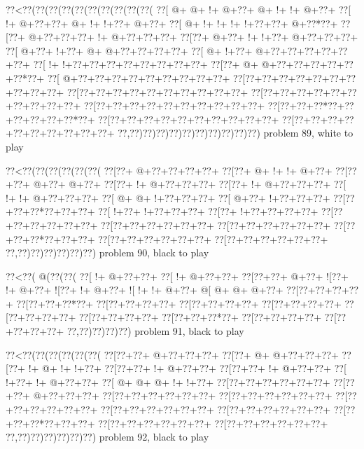 \vbox{\vbox{\goo
\0??<\0??(\0??(\0??(\0??(\0??(\0??(\0??(\0??(\0??(\0??(
\0??[\- @+\- @+\- !+\- @+\0??+\- @+\- !+\- !+\- @+\0??+
\0??[\- !+\- @+\0??+\0??+\- @+\- !+\- !+\0??+\- @+\0??+
\0??[\- @+\- !+\- !+\- !+\- !+\0??+\0??+\- @+\0??*\0??+
\0??[\0??+\- @+\0??+\0??+\0??+\- !+\- @+\0??+\0??+\0??+
\0??[\0??+\- @+\0??+\- !+\- !+\0??+\- @+\0??+\0??+\0??+
\0??[\- @+\0??+\- !+\0??+\- @+\- @+\0??+\0??+\0??+\0??+
\0??[\- @+\- !+\0??+\- @+\0??+\0??+\0??+\0??+\0??+\0??+
\0??[\- !+\- !+\0??+\0??+\0??+\0??+\0??+\0??+\0??+\0??+
\0??[\0??+\- @+\- @+\0??+\0??+\0??+\0??+\0??+\0??*\0??+
\0??[\- @+\0??+\0??+\0??+\0??+\0??+\0??+\0??+\0??+\0??+
\0??[\0??+\0??+\0??+\0??+\0??+\0??+\0??+\0??+\0??+\0??+
\0??[\0??+\0??+\0??+\0??+\0??+\0??+\0??+\0??+\0??+\0??+
\0??[\0??+\0??+\0??+\0??+\0??+\0??+\0??+\0??+\0??+\0??+
\0??[\0??+\0??+\0??+\0??+\0??+\0??+\0??+\0??+\0??+\0??+
\0??[\0??+\0??+\0??*\0??+\0??+\0??+\0??+\0??+\0??*\0??+
\0??[\0??+\0??+\0??+\0??+\0??+\0??+\0??+\0??+\0??+\0??+
\0??[\0??+\0??+\0??+\0??+\0??+\0??+\0??+\0??+\0??+\0??+
\0??,\0??)\0??)\0??)\0??)\0??)\0??)\0??)\0??)\0??)\0??)
}
\hfil problem 89, white to play\hfil\break
}

\vbox{\vbox{\goo
\0??<\0??(\0??(\0??(\0??(\0??(\0??(
\0??[\0??+\- @+\0??+\0??+\0??+\0??+
\0??[\0??+\- @+\- !+\- !+\- @+\0??+
\0??[\0??+\0??+\- @+\0??+\- @+\0??+
\0??[\0??+\- !+\- @+\0??+\0??+\0??+
\0??[\0??+\- !+\- @+\0??+\0??+\0??+
\0??[\- !+\- !+\- @+\0??+\0??+\0??+
\0??[\- @+\- @+\- !+\0??+\0??+\0??+
\0??[\- @+\0??+\- !+\0??+\0??+\0??+
\0??[\0??+\0??+\0??*\0??+\0??+\0??+
\0??[\- !+\0??+\- !+\0??+\0??+\0??+
\0??[\0??+\- !+\0??+\0??+\0??+\0??+
\0??[\0??+\0??+\0??+\0??+\0??+\0??+
\0??[\0??+\0??+\0??+\0??+\0??+\0??+
\0??[\0??+\0??+\0??+\0??+\0??+\0??+
\0??[\0??+\0??+\0??*\0??+\0??+\0??+
\0??[\0??+\0??+\0??+\0??+\0??+\0??+
\0??[\0??+\0??+\0??+\0??+\0??+\0??+
\0??,\0??)\0??)\0??)\0??)\0??)\0??)
}
\hfil problem 90, black to play\hfil\break
}

\vbox{\vbox{\goo
\0??<\0??(\- @(\0??(\0??(
\0??[\- !+\- @+\0??+\0??+
\0??[\- !+\- @+\0??+\0??+
\0??[\0??+\0??+\- @+\0??+
\- ![\0??+\- !+\- @+\0??+
\- ![\0??+\- !+\- @+\0??+
\- ![\- !+\- !+\- @+\0??+
\- @[\- @+\- @+\- @+\0??+
\0??[\0??+\0??+\0??+\0??+
\0??[\0??+\0??+\0??*\0??+
\0??[\0??+\0??+\0??+\0??+
\0??[\0??+\0??+\0??+\0??+
\0??[\0??+\0??+\0??+\0??+
\0??[\0??+\0??+\0??+\0??+
\0??[\0??+\0??+\0??+\0??+
\0??[\0??+\0??+\0??*\0??+
\0??[\0??+\0??+\0??+\0??+
\0??[\0??+\0??+\0??+\0??+
\0??,\0??)\0??)\0??)\0??)
}
\hfil problem 91, black to play\hfil\break
}

\vbox{\vbox{\goo
\0??<\0??(\0??(\0??(\0??(\0??(\0??(
\0??[\0??+\0??+\- @+\0??+\0??+\0??+
\0??[\0??+\- @+\- @+\0??+\0??+\0??+
\0??[\0??+\- !+\- @+\- !+\- !+\0??+
\0??[\0??+\0??+\- !+\- @+\0??+\0??+
\0??[\0??+\0??+\- !+\- @+\0??+\0??+
\0??[\- !+\0??+\- !+\- @+\0??+\0??+
\0??[\- @+\- @+\- @+\- !+\- !+\0??+
\0??[\0??+\0??+\0??+\0??+\0??+\0??+
\0??[\0??+\0??+\- @+\0??+\0??+\0??+
\0??[\0??+\0??+\0??+\0??+\0??+\0??+
\0??[\0??+\0??+\0??+\0??+\0??+\0??+
\0??[\0??+\0??+\0??+\0??+\0??+\0??+
\0??[\0??+\0??+\0??+\0??+\0??+\0??+
\0??[\0??+\0??+\0??+\0??+\0??+\0??+
\0??[\0??+\0??+\0??*\0??+\0??+\0??+
\0??[\0??+\0??+\0??+\0??+\0??+\0??+
\0??[\0??+\0??+\0??+\0??+\0??+\0??+
\0??,\0??)\0??)\0??)\0??)\0??)\0??)
}
\hfil problem 92, black to play\hfil\break
}


